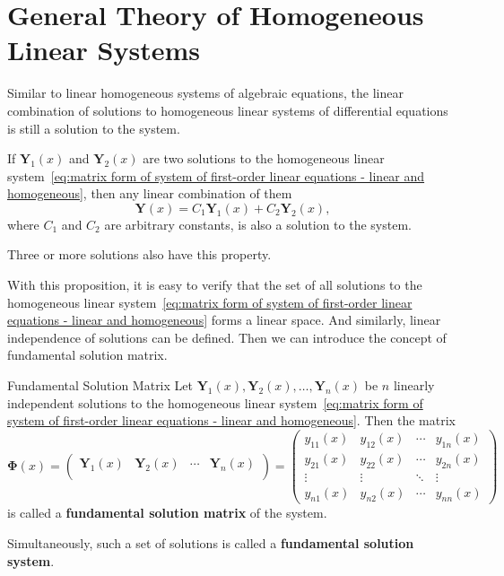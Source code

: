 \documentclass[11pt]{../../TexTemplate/elegantbook}
\begin{document}
\vspace{0.7cm}


\section{General Theory of Homogeneous Linear Systems}
Similar to linear homogeneous systems of algebraic equations,
the linear combination of solutions to homogeneous linear systems of differential equations
is still a solution to the system.
\begin{proposition}
    If \(\mathbf{Y}_{1}(x)\) and \(\mathbf{Y}_{2}(x)\) are two solutions to the homogeneous linear system~\eqref{eq:matrix form of system of first-order linear equations - linear and homogeneous},
    then any linear combination of them
    \[
    \mathbf{Y}(x) = C_{1} \mathbf{Y}_{1}(x) + C_{2} \mathbf{Y}_{2}(x),
    \]
    where \(C_{1}\) and \(C_{2}\) are arbitrary constants, is also a solution to the system.

    Three or more solutions also have this property.
\end{proposition}
With this proposition, it is easy to verify that the set of all solutions to 
the homogeneous linear system~\eqref{eq:matrix form of system of first-order linear equations - linear and homogeneous}
forms a linear space. And similarly, linear independence of solutions can be defined.
Then we can introduce the concept of fundamental solution matrix.

\begin{definition}{Fundamental Solution Matrix}
    Let \(\mathbf{Y}_{1}(x), \mathbf{Y}_{2}(x), \ldots, \mathbf{Y}_{n}(x)\) be \(n\) linearly independent solutions to 
    the homogeneous linear system~\eqref{eq:matrix form of system of first-order linear equations - linear and homogeneous}.
    Then the matrix
    \[
    \mathbf{\Phi}(x) = 
    \begin{pmatrix}
        \mathbf{Y}_{1}(x) & \mathbf{Y}_{2}(x) & \cdots & \mathbf{Y}_{n}(x) \\
    \end{pmatrix}
    = 
    \begin{pmatrix}
        y_{11}(x) & y_{12}(x) & \cdots & y_{1n}(x) \\
        y_{21}(x) & y_{22}(x) & \cdots & y_{2n}(x) \\
        \vdots & \vdots & \ddots & \vdots \\
        y_{n1}(x) & y_{n2}(x) & \cdots & y_{nn}(x)
    \end{pmatrix}
    \]
    is called a \textbf{fundamental solution matrix} of the system.

    Simultaneously, such a set of solutions is called a \textbf{fundamental solution system}.
\end{definition}
\end{document}
